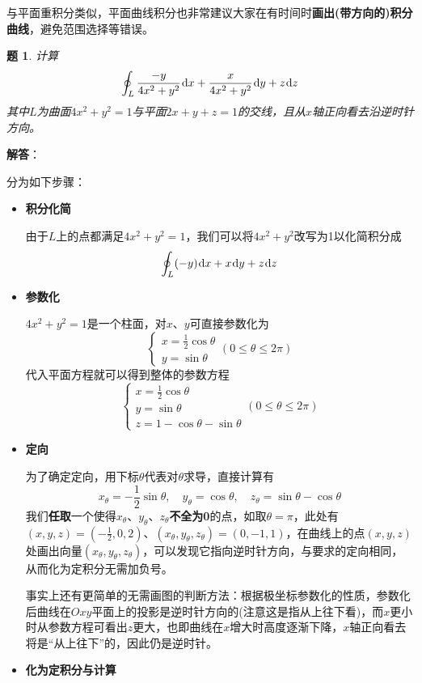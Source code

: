 \documentclass[a4paper,UTF8,fontset=windows,AutoFakeBold]{ctexart}
\newcommand*{\dr}{\hspace{0.07em}\mathrm{d}}
\newcommand*{\note}{\noindent *}
\theoremstyle{ex}
\newtheorem{exercise}{题}
\newcommand{\sol}[1]{{\vspace{5pt}\kaishu\noindent\textbf{解答}：\vspace{-3pt}
\begin{compactitem}
    \item[] #1
\end{compactitem}
}}
\begin{document}
\note 与平面重积分类似，平面曲线积分也非常建议大家在有时间时\textbf{画出(带方向的)积分曲线}，避免范围选择等错误。

\begin{framed}
\begin{exercise}
    计算
    $$\oint_L\frac{-y}{4x^2+y^2}\dr x+\frac{x}{4x^2+y^2}\dr y+z\dr z$$
    其中$L$为曲面$4x^2+y^2=1$与平面$2x+y+z=1$的交线，且从$x$轴正向看去沿逆时针方向。
\end{exercise}
\sol{
    分为如下步骤：
    \begin{itemize}
        \item \textbf{积分化简}
        
        由于$L$上的点都满足$4x^2+y^2=1$，我们可以将$4x^2+y^2$改写为1以化简积分成
        $$\oint_L(-y)\dr x+x\dr y+z\dr z$$

        \item \textbf{参数化}
        
        $4x^2+y^2=1$是一个柱面，对$x$、$y$可直接参数化为
        $$\begin{cases}x=\frac{1}{2}\cos\theta\\y=\sin\theta\end{cases}(0\le\theta\le2\pi)$$
        代入平面方程就可以得到整体的参数方程
        $$\begin{cases}x=\frac{1}{2}\cos\theta\\y=\sin\theta\\z=1-\cos\theta-\sin\theta\end{cases}(0\le\theta\le2\pi)$$
        
        \item \textbf{定向}
        
        为了确定定向，用下标$\theta$代表对$\theta$求导，直接计算有
        $$x_\theta=-\frac{1}{2}\sin\theta,\quad y_\theta=\cos\theta,\quad z_\theta=\sin\theta-\cos\theta$$
        我们\textbf{任取}一个使得$x_\theta$、$y_\theta$、$z_\theta$\textbf{不全为0}的点，如取$\theta=\pi$，此处有$(x,y,z)=(-\frac{1}{2},0,2)$、$(x_\theta,y_\theta,z_\theta)=(0,-1,1)$，在曲线上的点$(x,y,z)$处画出向量$(x_\theta,y_\theta,z_\theta)$，可以发现它指向逆时针方向，与要求的定向相同，从而化为定积分无需加负号。

        \note 事实上还有更简单的无需画图的判断方法：根据极坐标参数化的性质，参数化后曲线在$Oxy$平面上的投影是逆时针方向的(注意这是指从上往下看)，而$x$更小时从参数方程可看出$z$更大，也即曲线在$x$增大时高度逐渐下降，$x$轴正向看去将是``从上往下''的，因此仍是逆时针。

        \item \textbf{化为定积分与计算}
        

\end{itemize}}
\end{framed}
\end{document}
